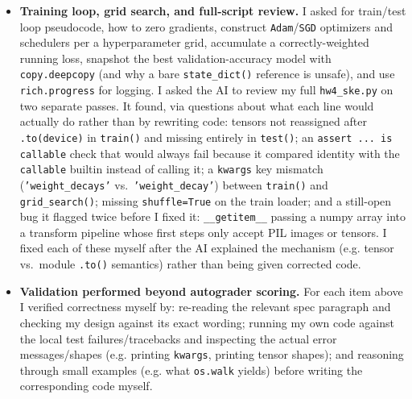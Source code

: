 \begin{itemize}[leftmargin=*]
\item \textbf{Training loop, grid search, and full-script review.}
I asked for train/test loop pseudocode, how to zero gradients, construct
\texttt{Adam}/\texttt{SGD} optimizers and schedulers per a hyperparameter grid, accumulate a
correctly-weighted running loss, snapshot the best validation-accuracy model with
\texttt{copy.deepcopy} (and why a bare \texttt{state\_dict()} reference is unsafe), and use
\texttt{rich.progress} for logging. I asked the AI to review my full \texttt{hw4\_ske.py} on
two separate passes. It found, via questions about what each line would actually do rather
than by rewriting code: tensors not reassigned after \texttt{.to(device)} in \texttt{train()}
and missing entirely in \texttt{test()}; an \texttt{assert ... is callable} check that would
always fail because it compared identity with the \texttt{callable} builtin instead of calling
it; a \texttt{kwargs} key mismatch (\texttt{'weight\_decays'} vs.\ \texttt{'weight\_decay'})
between \texttt{train()} and \texttt{grid\_search()}; missing \texttt{shuffle=True} on the
train loader; and a still-open bug it flagged twice before I fixed it: \texttt{\_\_getitem\_\_}
passing a numpy array into a transform pipeline whose first steps only accept
PIL images or tensors. I fixed each of these myself after the AI explained the mechanism
(e.g. tensor vs.\ module \texttt{.to()} semantics) rather than being given corrected code.

\item \textbf{Validation performed beyond autograder scoring.}
For each item above I verified correctness myself by: re-reading the relevant spec
paragraph and checking my design against its exact wording; running my own code against
the local test failures/tracebacks and inspecting the actual error messages/shapes
(e.g. printing \texttt{kwargs}, printing tensor shapes); and reasoning through small
examples (e.g. what \texttt{os.walk} yields) before writing the corresponding code myself.

\end{itemize}
